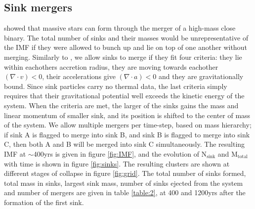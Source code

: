 \documentclass[fleqn,usenatbib]{mnras}
\begin{document}
\subsection{Sink mergers}
\cite{Bonnell2005} showed that massive stars can form through the merger of a high-mass close binary. The total number of sinks and their masses  would be unrepresentative of the IMF if they were allowed to bunch up and lie on top of one another without merging. Similarly to \cite{Federrath2010}, we allow sinks to merge if they fit four criteria: they lie within eachothers accretion radius, they are moving towards eachother $(\nabla \cdot v) < 0$, their accelerations give $(\nabla \cdot a) <0$ and they are gravitationally bound. Since sink particles carry no thermal data, the last criteria simply requires that their gravitational potential well exceeds the kinetic energy of the system. When the criteria are met, the larger of the sinks gains the mass and linear momentum of smaller sink, and its position is shifted to the center of mass of the system. We allow multiple mergers per time-step, based on mass hierarchy; if sink A is flagged to merge into sink B, and sink B is flagged to merge into sink C, then both A and B will be merged into sink C simultaneously. The resulting IMF at $\sim$400yrs is given in figure \ref{fig:IMF}, and the evolution of N$_{\text{sink}}$ and M$_{\text{total}}$ with time is shown in figure \ref{fig:sinks}. The resulting clusters are shown at different stages of collapse in figure \ref{fig:grid}. The total number of sinks formed, total mass in sinks, largest sink mass, number of sinks ejected from the system and number of mergers are given in table \ref{table:2}, at 400 and 1200yrs after the formation of the first sink.
\end{document}
